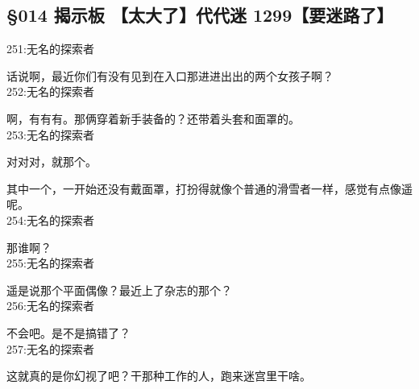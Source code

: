 \subsection{§014 揭示板 【太大了】代代迷 1299【要迷路了】}

251:无名的探索者

话说啊，最近你们有没有见到在入口那进进出出的两个女孩子啊？\\

252:无名的探索者

啊，有有有。那俩穿着新手装备的？还带着头套和面罩的。\\

253:无名的探索者

对对对，就那个。

其中一个，一开始还没有戴面罩，打扮得就像个普通的滑雪者一样，感觉有点像遥呢。\\

254:无名的探索者

那谁啊？\\

255:无名的探索者

遥是说那个平面偶像？最近上了杂志的那个？\\

256:无名的探索者

不会吧。是不是搞错了？\\

257:无名的探索者

这就真的是你幻视了吧？干那种工作的人，跑来迷宫里干啥。

